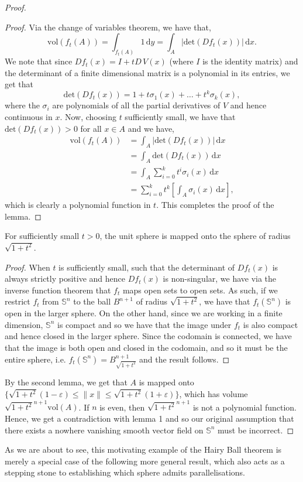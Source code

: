 \documentclass[12pt,a4paper]{article}
\begin{document}
\begin{proof}
\begin{proof}
Via the change of variables theorem, we have that,
\[
\mathrm{vol}(f_t(A))=\int_{f_t(A)}1\,\mathrm{d}y=\int_A|\mathrm{det}(Df_t(x))|\,\mathrm{d}x.
\]
We note that since $Df_t(x)=I+tD\,V(x)$ (where $I$ is the identity matrix) and the determinant of a finite dimensional matrix is a polynomial in its entries, we get that \[\mathrm{det}(Df_t(x))=1+t\sigma_1(x)+\ldots+t^k\sigma_k(x),\] where the $\sigma_i$ are polynomials of all the partial derivatives of $V$ and hence continuous in $x$. Now, choosing $t$ sufficiently small, we have that $\mathrm{det}(Df_t(x))>0$ for all $x\in A$ and we have,
\begin{align*}
\mathrm{vol}(f_t(A))&=\int_A|\mathrm{det}(Df_t(x))|\,\mathrm{d}x\\
&=\int_A\mathrm{det}(Df_t(x))\,\mathrm{d}x\\
&=\int_A\sum_{i=0}^kt^i\sigma_i(x)\,\mathrm{d}x\\
&=\sum_{i=0}^kt^k\left[\int_A\sigma_i(x)\,\mathrm{d}x\right],
\end{align*}
which is clearly a polynomial function in $t$. This completes the proof of the lemma.
\end{proof}
\begin{lemma}
For sufficiently small $t>0$, the unit sphere is mapped onto the sphere of radius $\sqrt{1+t^2}$.
\end{lemma}
\begin{proof}
When $t$ is sufficiently small, such that the determinant of $Df_t(x)$ is always strictly positive and hence $Df_t(x)$ is non-singular, we have via the inverse function theorem that $f_t$ maps open sets to open sets. As such, if we restrict $f_t$ from $\mathbb{S}^n$ to the ball $B^{n+1}$ of radius $\sqrt{1+t^2}$, we have that $f_t(\mathbb{S}^n)$ is open in the larger sphere. On the other hand, since we are working in a finite dimension, $\mathbb{S}^n$ is compact and so we have that the image under $f_t$ is also compact and hence closed in the larger sphere. Since the codomain is connected, we have that the image is both open and closed in the codomain, and so it must be the entire sphere, i.e. $f_t(\mathbb{S}^n)=B^{n+1}_{\sqrt{1+t^2}}$ and the result follows. 
\end{proof}
By the second lemma, we get that $A$ is mapped onto $\{\sqrt{1+t^2}(1-\varepsilon)\leq\|x\|\leq\sqrt{1+t^2}(1+\varepsilon)\}$, which has volume $\sqrt{1+t^2}^{n+1}\mathrm{vol}(A)$. If $n$ is even, then $\sqrt{1+t^2}^{n+1}$ is not a polynomial function. Hence, we get a contradiction with lemma 1 and so our original assumption that there exists a nowhere vanishing smooth vector field on $\mathbb{S}^n$ must be incorrect.
\end{proof}
As we are about to see, this motivating example of the Hairy Ball theorem is merely a special case of the following more general result, which also acts as a stepping stone to establishing which sphere admits parallelisations.\\
\end{document}
